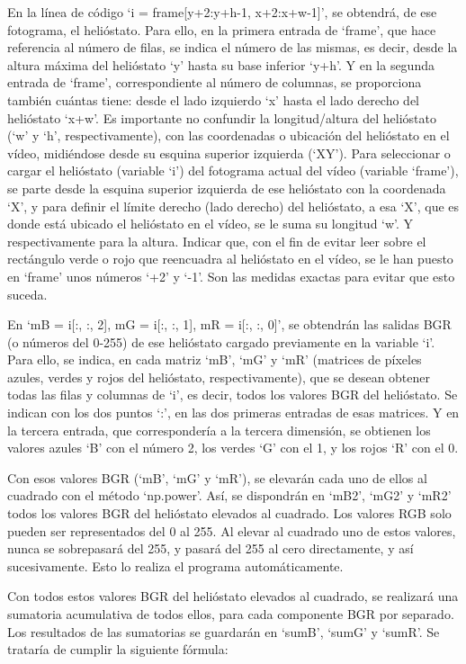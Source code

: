 En la línea de código ‘i = frame[y+2:y+h-1, x+2:x+w-1]’, se obtendrá, de ese fotograma, el helióstato. Para ello, en la primera entrada de ‘frame’, que hace referencia al número de filas, se indica el número de las mismas, es decir, desde la altura máxima del helióstato ‘y’ hasta su base inferior ‘y+h’. Y en la segunda entrada de ‘frame’, correspondiente al número de columnas, se proporciona también cuántas tiene: desde el lado izquierdo ‘x’ hasta el lado derecho del helióstato ‘x+w’. Es importante no confundir la longitud/altura del helióstato (‘w’ y ‘h’, respectivamente), con las coordenadas o ubicación del helióstato en el vídeo, midiéndose desde su esquina superior izquierda (‘XY’). Para seleccionar o cargar el helióstato (variable ‘i’) del fotograma actual del vídeo (variable ‘frame’), se parte desde la esquina superior izquierda de ese helióstato con la coordenada ‘X’, y para definir el límite derecho (lado derecho) del helióstato, a esa ‘X’, que es donde está ubicado el helióstato en el vídeo, se le suma su longitud ‘w’. Y respectivamente para la altura. Indicar que, con el fin de evitar leer sobre el rectángulo verde o rojo que reencuadra al helióstato en el vídeo, se le han puesto en ‘frame’ unos números ‘+2’ y ‘-1’. Son las medidas exactas para evitar que esto suceda.

En ‘mB = i[:, :, 2], mG = i[:, :, 1], mR = i[:, :, 0]’, se obtendrán las salidas BGR (o números del 0-255) de ese helióstato cargado previamente en la variable ‘i’. Para ello, se indica, en cada matriz ‘mB’, ‘mG’ y ‘mR’ (matrices de píxeles azules, verdes y rojos del helióstato, respectivamente), que se desean obtener todas las filas y columnas de ‘i’, es decir, todos los valores BGR del helióstato. Se indican con los dos puntos ‘:’, en las dos primeras entradas de esas matrices. Y en la tercera entrada, que correspondería a la tercera dimensión, se obtienen los valores azules ‘B’ con el número 2, los verdes ‘G’ con el 1, y los rojos ‘R’ con el 0.

Con esos valores BGR (‘mB’, ‘mG’ y ‘mR’), se elevarán cada uno de ellos al cuadrado con el método ‘np.power’. Así, se dispondrán en ‘mB2’, ‘mG2’ y ‘mR2’ todos los valores BGR del helióstato elevados al cuadrado. Los valores RGB solo pueden ser representados del 0 al 255. Al elevar al cuadrado uno de estos valores, nunca se sobrepasará del 255, y pasará del 255 al cero directamente, y así sucesivamente. Esto lo realiza el programa automáticamente.

Con todos estos valores BGR del helióstato elevados al cuadrado, se realizará una sumatoria acumulativa de todos ellos, para cada componente BGR por separado. Los resultados de las sumatorias se guardarán en ‘sumB’, ‘sumG’ y ‘sumR’. Se trataría de cumplir la siguiente fórmula:

